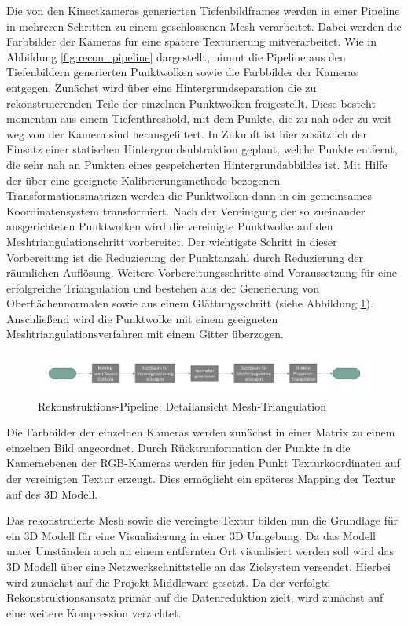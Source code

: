 Die von den Kinectkameras generierten Tiefenbildframes werden in einer Pipeline 
in mehreren Schritten zu einem geschlossenen Mesh verarbeitet. Dabei werden die
Farbbilder der Kameras für eine spätere Texturierung mitverarbeitet. Wie in 
Abbildung \ref{fig:recon_pipeline} dargestellt, nimmt die Pipeline aus den 
Tiefenbildern generierten Punktwolken sowie die Farbbilder der Kameras entgegen.
Zunächst wird über eine Hintergrundseparation die zu rekonstruierenden Teile der 
einzelnen Punktwolken freigestellt. Diese besteht momentan aus einem Tiefenthreshold, 
mit dem Punkte, die zu nah oder zu weit weg von der Kamera sind herausgefiltert. In 
Zukunft ist hier zusätzlich der Einsatz einer statischen Hintergrundsubtraktion 
geplant, welche Punkte entfernt, die sehr nah an Punkten eines gespeicherten 
Hintergrundabbildes ist. Mit Hilfe der über eine geeignete 
Kalibrierungsmethode bezogenen Transformationsmatrizen werden die Punktwolken 
dann in ein gemeinsames Koordinatensystem transformiert. Nach der Vereinigung 
der so zueinander ausgerichteten Punktwolken wird die vereinigte Punktwolke auf 
den Meshtriangulationschritt vorbereitet. Der wichtigste Schritt in dieser 
Vorbereitung ist die Reduzierung der Punktanzahl durch Reduzierung der räumlichen 
Auflösung. Weitere Vorbereitungsschritte sind Voraussetzung für eine erfolgreiche 
Triangulation und bestehen aus der Generierung von Oberflächennormalen sowie aus 
einem Glättungsschritt (siehe Abbildung \ref{fig:recon_pipeline_tri}). Anschließend wird 
die Punktwolke mit einem geeigneten Meshtriangulationsverfahren mit einem Gitter 
überzogen.

\begin{figure}[H]
	\centering
	\includegraphics[width=\textwidth]{figs/tri_pipe}
	\caption{Rekonstruktions-Pipeline: Detailansicht Mesh-Triangulation}
	\label{fig:recon_pipeline_tri}
\end{figure}

Die Farbbilder der einzelnen Kameras werden zunächst in einer Matrix zu einem 
einzelnen Bild angeordnet. Durch Rücktranformation der Punkte in die 
Kameraebenen der RGB-Kameras werden für jeden Punkt Texturkoordinaten auf der 
vereinigten Textur erzeugt. Dies ermöglicht ein späteres Mapping der Textur auf 
des 3D Modell.

Das rekonstruierte Mesh sowie die vereingte Textur bilden nun die Grundlage für 
ein 3D Modell für eine Visualisierung in einer 3D Umgebung. Da das Modell unter 
Umständen auch an einem entfernten Ort visualisiert werden soll wird das 3D 
Modell über eine Netzwerkschnittstelle an das Zielsystem versendet. Hierbei wird 
zunächst auf die Projekt-Middleware gesetzt. Da der verfolgte Rekonstruktionsansatz 
primär auf die Datenreduktion zielt, wird zunächst auf eine weitere Kompression verzichtet.

